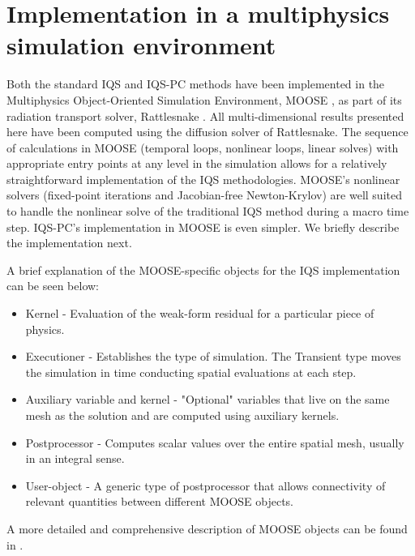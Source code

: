 \documentclass{elsarticle}
\newcommand{\iqspc}{IQS-PC\xspace}
\begin{document}
\section{Implementation in a multiphysics simulation environment}

Both the standard IQS and \iqspc methods have been implemented in the Multiphysics Object-Oriented Simulation Environment, MOOSE \cite{moose}, as part of its radiation transport solver, Rattlesnake \cite{wang2013}. All multi-dimensional results presented here have been computed using the diffusion solver of Rattlesnake. The sequence of 
calculations in MOOSE (temporal loops, nonlinear loops, linear solves) with appropriate entry points at any level in the simulation allows for a relatively straightforward implementation of the IQS methodologies. MOOSE's nonlinear solvers (fixed-point iterations and Jacobian-free Newton-Krylov) are well suited to handle the nonlinear solve of the traditional IQS method during a macro time step. \iqspc's implementation in MOOSE is even simpler. We briefly describe the implementation next. 

A brief explanation of the MOOSE-specific objects for the IQS implementation can be seen below:
\begin{itemize}
\item Kernel - Evaluation of the weak-form residual for a particular piece of physics.
\item Executioner - Establishes the type of simulation. The Transient type moves the simulation in time conducting spatial evaluations at each step.
\item Auxiliary variable and kernel - "Optional" variables that live on the same mesh as the solution and are computed using auxiliary kernels. 
\item Postprocessor - Computes scalar values over the entire spatial mesh, usually in an integral sense.
\item User-object - A generic type of postprocessor that allows connectivity of relevant quantities between different MOOSE objects.
\end{itemize}
A more detailed and comprehensive description of MOOSE objects can be found in \cite{moose_training}.
\end{document}
